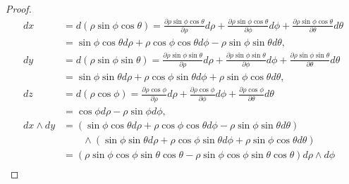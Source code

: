 \begin{proof}
	\begingroup
	\allowdisplaybreaks%
	\begin{align*}
		dx                     & = d(\rho\sin\phi\cos\theta) = \frac{\partial \rho\sin\phi\cos\theta}{\partial\rho} d\rho + \frac{\partial \rho\sin\phi\cos\theta}{\partial\phi} d\phi + \frac{\partial \rho\sin\phi\cos\theta}{\partial\theta} d\theta \\
		                       & = \sin\phi\cos\theta d\rho + \rho\cos\phi\cos\theta d\phi - \rho\sin\phi\sin\theta d\theta,                                                                                                                            \\
		dy                     & = d(\rho\sin\phi\sin\theta) = \frac{\partial \rho\sin\phi\sin\theta}{\partial\rho} d\rho + \frac{\partial \rho\sin\phi\sin\theta}{\partial\phi} d\phi + \frac{\partial \rho\sin\phi\sin\theta}{\partial\theta} d\theta \\
		                       & = \sin\phi\sin\theta d\rho + \rho\cos\phi\sin\theta d\phi + \rho\sin\phi\cos\theta d\theta,                                                                                                                            \\
		dz                     & = d(\rho\cos\phi) = \frac{\partial \rho\cos\phi}{\partial\rho} d\rho + \frac{\partial \rho\cos\phi}{\partial\phi} d\phi + \frac{\partial \rho\cos\phi}{\partial\theta} d\theta                                         \\
		                       & = \cos\phi d\rho - \rho\sin\phi d\phi,                                                                                                                                                                                 \\
		dx \wedge dy           & = (\sin\phi\cos\theta d\rho + \rho\cos\phi\cos\theta d\phi - \rho\sin\phi\sin\theta d\theta)                                                                                                                           \\
		                       & \qquad \wedge (\sin\phi\sin\theta d\rho + \rho\cos\phi\sin\theta d\phi + \rho\sin\phi\cos\theta d\theta)                                                                                                               \\
		                       & = (\rho \sin\phi\cos\phi\sin\theta\cos\theta - \rho\sin\phi\cos\phi\sin\theta\cos\theta) d\rho \wedge d\phi                                                                                                            \\

\end{align*}
\end{proof}
